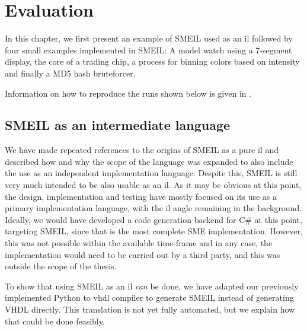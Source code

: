 \chapter{Evaluation}
\label{eval}

In this chapter, we first present an example of SMEIL used as an \gls{il}
followed by four small examples implemented in SMEIL: A model watch using a
7-segment display, the core of a trading chip, a process for binning colors
based on intensity and finally a MD5 hash bruteforcer.

Information on how to reproduce the runs shown below is given in
.


\section{SMEIL as an intermediate language}
\label{sec:smeilil}
We have made repeated references to the origins of SMEIL as a pure \gls{il} and
described how and why the scope of the language was expanded to also include the
use as an independent implementation language. Despite this, SMEIL is still very
much intended to be also usable as an \gls{il}. As it may be obvious at this
point, the design, implementation and testing have mostly focused on its use as
a primary implementation language, with the \gls{il} angle remaining in the
background. Ideally, we would have developed a code generation backend for C\#
at this point, targeting SMEIL, since that is the most complete SME
implementation. %
However, this was not possible within the available time-frame
and in any case, the implementation would need to be carried out by a third
party, and this was outside the scope of the thesis.

To show that using SMEIL as an \gls{il} {\itshape can} be done, we have adapted
our previously implemented Python to \gls{vhdl} compiler to generate SMEIL
instead of generating VHDL directly. This translation is not yet fully
automated, but we explain how that could be done feasibly.

